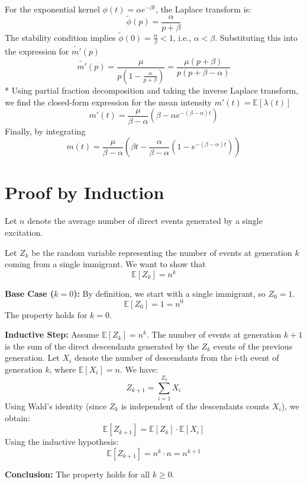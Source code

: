 \documentclass[a4paper,11pt]{article}
\begin{document}
For the exponential kernel $\phi(t) = \alpha e^{-\beta t}$, the Laplace transform is:
$$     \tilde{\phi}(p) = \frac{\alpha}{p + \beta}
$$ 
The stability condition implies $\tilde{\phi}(0) = \frac{\alpha}{\beta} < 1$, i.e., $\alpha < \beta$. Substituting this into the expression for $\tilde{m'}(p)$
$$    \tilde{m'}(p) = \frac{\mu}{p \left(1 - \frac{\alpha}{p + \beta}\right)} = \frac{\mu (p + \beta)}{p (p + \beta - \alpha)}
$$*
Using partial fraction decomposition and taking the inverse Laplace transform, we find the closed-form expression for the mean intensity $m'(t) = \mathbb{E}[\lambda(t)]$
$$    m'(t) = \frac{\mu}{\beta - \alpha} \left(\beta - \alpha e^{-(\beta - \alpha) t}\right)
$$
Finally, by integrating
\begin{equation}
    \boxed{m(t) = \frac{\mu}{\beta - \alpha} \left( \beta t - \frac{\alpha}{\beta - \alpha} (1 - e^{-(\beta - \alpha) t}) \right)}
\end{equation}

\section{Proof by Induction}

Let $n$ denote the average number of direct events generated by a single excitation.

Let $Z_k$ be the random variable representing the number of events at generation $k$ coming from a single immigrant. We want to show that
\begin{equation}
    \mathbb{E}[Z_k] = n^k
\end{equation}

\textbf{Base Case ($k=0$):}
By definition, we start with a single immigrant, so $Z_0 = 1$.
$$ \mathbb{E}[Z_0] = 1 = n^0 $$
The property holds for $k=0$.

\textbf{Inductive Step:}
Assume $\mathbb{E}[Z_k] = n^k$. The number of events at generation $k+1$ is the sum of the direct descendants generated by the $Z_k$ events of the previous generation. Let $X_i$ denote the number of descendants from the i-th event of generation $k$, where $\mathbb{E}[X_i] = n$. We have:
$$ Z_{k+1} = \sum_{i=1}^{Z_k} X_i $$
Using Wald's identity (since $Z_k$ is independent of the descendants counts $X_i$), we obtain:
$$ \mathbb{E}[Z_{k+1}] = \mathbb{E}[Z_k] \cdot \mathbb{E}[X_i] $$
Using the inductive hypothesis:
$$ \mathbb{E}[Z_{k+1}] = n^k \cdot n = n^{k+1} $$

\textbf{Conclusion:}
The property holds for all $k \ge 0$.
\end{document}

